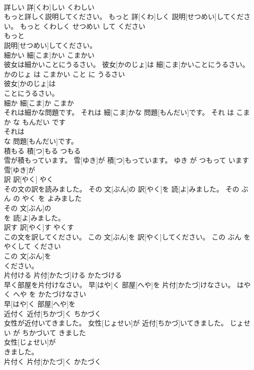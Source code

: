 \documentclass[8pt]{extreport}
\begin{document}
\begin{CJK}{UTF8}{min}
\\	詳しい	詳[くわ]しい	くわしい	
\\	もっと詳しく説明してください。	もっと 詳[くわ]しく 説明[せつめい]してください。	もっと くわしく せつめい して ください	
\\	もっと
\\	説明[せつめい]してください。			
\\	細かい	細[こま]かい	こまかい	
\\	彼女は細かいことにうるさい。	彼女[かのじょ]は 細[こま]かいことにうるさい。	かのじょ は こまかい こと に うるさい	
\\	彼女[かのじょ]は
\\	ことにうるさい。			
\\	細か	細[こま]か	こまか	
\\	それは細かな問題です。	それは 細[こま]かな 問題[もんだい]です。	それ は こまか な もんだい です	
\\	それは
\\	な 問題[もんだい]です。			
\\	積もる	積[つ]もる	つもる	
\\	雪が積もっています。	雪[ゆき]が 積[つ]もっています。	ゆき が つもって います	
\\	雪[ゆき]が
\\	訳	訳[やく]	やく	
\\	その文の訳を読みました。	その 文[ぶん]の 訳[やく]を 読[よ]みました。	その ぶん の やく を よみました	
\\	その 文[ぶん]の
\\	を 読[よ]みました。			
\\	訳す	訳[やく]す	やくす	
\\	この文を訳してください。	この 文[ぶん]を 訳[やく]してください。	この ぶん を やくして ください	
\\	この 文[ぶん]を
\\	ください。			
\\	片付ける	片付[かたづ]ける	かたづける	
\\	早く部屋を片付けなさい。	早[はや]く 部屋[へや]を 片付[かたづ]けなさい。	はやく へや を かたづけなさい	
\\	早[はや]く 部屋[へや]を
\\	近付く	近付[ちかづ]く	ちかづく	
\\	女性が近付いてきました。	女性[じょせい]が 近付[ちかづ]いてきました。	じょせい が ちかづいて きました	
\\	女性[じょせい]が
\\	きました。			
\\	片付く	片付[かたづ]く	かたづく	

\end{CJK}
\end{document}
